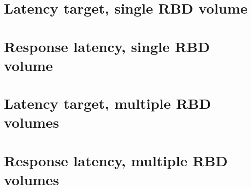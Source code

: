 \documentclass[titlepage]{report}
\begin{document}




\part{Latency target, single RBD volume}


\part{Response latency, single RBD volume}
\part{Latency target, multiple RBD volumes}
\part{Response latency, multiple RBD volumes}
\end{document}
